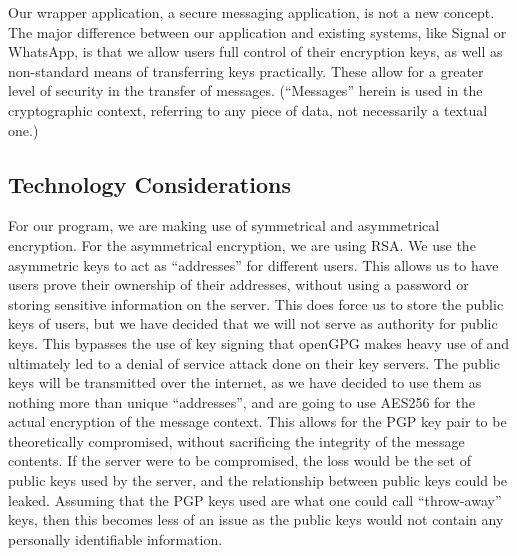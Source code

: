 \documentclass[11pt]{article}
\begin{document}
Our wrapper application, a secure messaging application, is not a new concept. The major difference between our application and existing systems, like Signal or WhatsApp, is that we allow users full control of their encryption keys, as well as non-standard means of transferring keys practically. These allow for a greater level of security in the transfer of messages. (“Messages” herein is used in the cryptographic context, referring to any piece of data, not necessarily a textual one.)

\subsection{Technology Considerations}
For our program, we are making use of symmetrical and asymmetrical encryption. For the asymmetrical encryption, we are using RSA. We use the asymmetric keys to act as “addresses” for different users. This allows us to have users prove their ownership of their addresses, without using a password or storing sensitive information on the server. This does force us to store the public keys of users, but we have decided that we will not serve as authority for public keys. This bypasses the use of key signing that openGPG makes heavy use of and ultimately led to a denial of service attack done on their key servers. The public keys will be transmitted over the internet, as we have decided to use them as nothing more than unique “addresses”, and are going to use AES256 for the actual encryption of the message context. This allows for the PGP key pair to be  theoretically compromised, without sacrificing the integrity of the message contents. If the server were to be compromised, the loss would be the set of public keys used by the server, and the relationship between public keys could be leaked. Assuming that the PGP keys used are what one could call “throw-away” keys, then this becomes less of an issue as the public keys would not contain any personally identifiable information.\\
\end{document}
